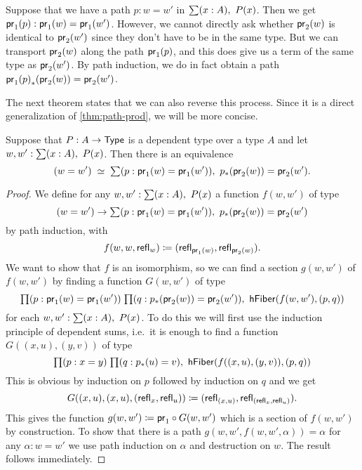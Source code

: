 Suppose that we have a path $p:w=w'$ in $\sm{x:A}P(x)$.
Then we get ${\mathsf{pr}_{1}}\!\left({p}\right):\mathsf{pr}_{1}(w)=\mathsf{pr}_{1}(w')$.
However, we cannot directly ask whether $\mathsf{pr}_{2}(w)$ is identical to $\mathsf{pr}_{2}(w')$ since they don't have to be in the same type.
But we can transport $\mathsf{pr}_{2}(w)$ along the path ${\mathsf{pr}_{1}}\!\left({p}\right)$, and this does give us a term of the same type as $\mathsf{pr}_{2}(w')$.
By path induction, we do in fact obtain a path ${{\mathsf{pr}_{1}}\!\left({p}\right)}_{*}\!\left({\mathsf{pr}_{2}(w)}\right)=\mathsf{pr}_{2}(w')$.

The next theorem states that we can also reverse this process.
Since it is a direct generalization of \autoref{thm:path-prod}, we will be more concise.

\begin{thm}\label{thm:path-sigma}
Suppose that $P:A\to\mathsf{Type}$ is a dependent type over a type $A$ and let $w,w^\prime:\sm{x:A}P(x)$. Then there is an equivalence
\begin{equation*}
\eqvspaced{(w=w')}{\sm{p:\proj{1}(w)=\proj{1}(w')}\trans{p}{\proj{2}(w)}=\proj{2}(w^\prime)}.
\end{equation*}
\end{thm}

\begin{proof}
We define for any $w,w':\sm{x:A}P(x)$ a function $f(w,w')$ of type
\begin{equation*}
(w=w')\to\sm{p:\proj{1}(w)=\proj{1}(w')}\trans{p}{\proj{2}(w)}=\proj{2}(w^\prime)
\end{equation*}
by path induction, with 
\begin{equation*}
f(w,w,\mathsf{refl}_{w})\coloneqq(\mathsf{refl}_{\mathsf{pr}_{1}(w)},\mathsf{refl}_{\mathsf{pr}_{2}(w)}).
\end{equation*}
We want to show that $f$ is an isomorphism, so we can find a section $g(w,w')$ of $f(w,w')$ by finding a function $G(w,w')$ of type
\begin{equation*}
\prd{p:\proj 1(w)=\proj 1(w')}{q:\trans p{\proj 2(w)}=\proj 2(w')}\mathsf{hFiber}(f(w,w'),(p,q))
\end{equation*}
for each $w,w':\sm{x:A}P(x)$. To do this we will first use the induction principle of dependent sums, i.e.\ it is enough to find a function $G((x,u),(y,v))$ of type
\begin{equation*}
\prd{p:x=y}{q:\trans{p}{u}=v}\hfiber{f((x,u),(y,v))}{(p,q)}
\end{equation*}
This is obvious by induction on $p$ followed by induction on $q$ and we get
\begin{equation*}
G((x,u),(x,u),(\mathsf{refl}_{x},\mathsf{refl}_{u}))\coloneqq(\mathsf{refl}_{(x,u)},\mathsf{refl}_{(\mathsf{refl}_{x},\mathsf{refl}_{u})}).
\end{equation*}
This gives the function $g(w,w')\coloneqq\mathsf{pr}_{1}\circ G(w,w')$ which is a section of $f(w,w')$ by construction. To show that there is a path $g(w,w',f(w,w',\alpha))=\alpha$ for any $\alpha:w=w'$ we use path induction on $\alpha$ and destruction on $w$. The result follows immediately.
\end{proof}


